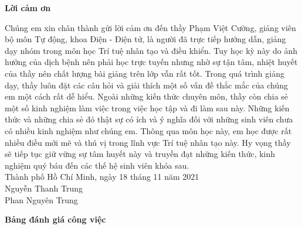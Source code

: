 \documentclass[a4paper, 12pt]{article}
\begin{document}

\renewcommand{\abstractnamefont}{\normalfont\Huge\bfseries}


\begin{center}
    \Huge \textbf{Lời cảm ơn}
\end{center}

\vspace{1.5cm}

\noindent
\hspace{3mm} Chúng em xin chân thành gửi lời cảm ơn đến thầy Phạm Việt Cường, giảng viên bộ môn Tự động, khoa Điện - Điện tử, là người đã trực tiếp hướng dẫn, giảng dạy nhóm trong môn học Trí tuệ nhân tạo và điều khiển. Tuy học kỳ này do ảnh hưởng của dịch bệnh nên phải học trực tuyến nhưng nhờ sự tận tâm, nhiệt huyết của thầy nên chất lượng bài giảng trên lớp vẫn rất tốt. Trong quá trình giảng dạy, thầy luôn đặt các câu hỏi và giải thích một số vấn đề thắc mắc của chúng em một cách rất dễ hiểu. Ngoài những kiến thức chuyên môn, thầy còn chia sẻ một số kinh nghiệm làm việc trong việc học tập và đi làm sau này. Những kiến thức và những chia sẻ đó thật sự có ích và ý nghĩa đối với những sinh viên chưa có nhiều kinh nghiệm như chúng em. Thông qua môn học này, em học được rất nhiều điều mới mẽ và thú vị trong lĩnh vực Trí tuệ nhân tạo này. Hy vọng thầy sẽ tiếp tục giữ vững sự tâm huyết này và truyền đạt những kiến thức, kinh nghiệm quý báu đến các thế hệ sinh viên khóa sau.\\

\hspace{6cm} Thành phố Hồ Chí Minh, ngày 18 tháng 11 năm 2021\\

\hspace{9cm} Nguyễn Thanh Trung\\

\hspace{9cm}  Phan Nguyên Trung\\

\newpage

\tableofcontents

\newpage

\begin{center}
    \Huge \textbf{Bảng đánh giá công việc}
\end{center}



\vspace{3cm}
\end{document}
